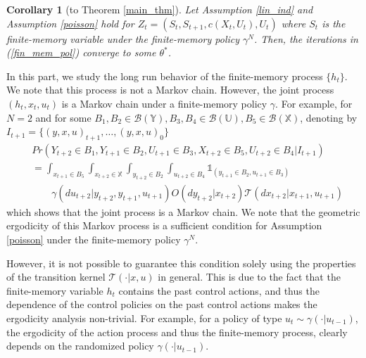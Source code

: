 \documentclass[11pt]{article}
\newtheorem{corollary}{Corollary}
\begin{document}
\begin{corollary}[to Theorem \ref{main_thm}]
 Let Assumption \ref{lin_ind} and  Assumption \ref{poisson} hold for $Z_t= (S_t,S_{t+1},c(X_t,U_t),U_t)$ where $S_t$ is the finite-memory variable under the finite-memory policy $\gamma^N$. Then, the iterations in (\ref{fin_mem_pol}) converge to some $\theta^*$. 
\end{corollary}



 In this part, we study the long run behavior of the finite-memory process $\{h_t\}$. We note that this process is not a Markov chain. However, the joint process $(h_t,x_{t},u_t)$ is a Markov chain under a finite-memory policy $\gamma$. For example, for $N=2$ and for some $B_1, B_2 \in  \mathcal{B}(\mathds{Y}), B_3,B_4 \in \mathcal{B}(\mathds{U}), B_5 \in \mathcal{B}(\mathds{X}) $, denoting by $I_{t+1} = \{(y,x,u)_ {t+1},\dots,(y,x,u)_{0}\}$
\begin{align*}
&Pr({Y}_{t+2} \in B_1,{Y}_{t+1} \in B_2, U_{t+1} \in B_3, X_{t+2}\in B_5,  {U}_{t+2}\in B_4 | I_{t+1} )\\
&= \int_{x_{t+1}\in B_5}\int_{x_{t+2}\in\mathds{X}} \int_{y_{t+2}\in B_2} \int_{u_{t+2}\in B_4}\mathds{1}_{(y_{t+1} \in B_2, u_{t+1}\in B_3)} \\
&  \qquad\gamma(du_{t+2}|y_{t+2},y_{t+1},u_{t+1})O(dy_{t+2}|x_{t+2}) \mathcal{T}(dx_{t+2}|x_{t+1},u_{t+1})
\end{align*}
which shows that the joint process is a Markov chain. We note that the geometric ergodicity of this Markov process is a sufficient condition for Assumption \ref{poisson} under the finite-memory policy $\gamma^N$.  


However, it is not possible to guarantee this condition solely using the properties of the transition kernel $\mathcal{T}(\cdot|x,u)$  in general. This is due to the fact that the finite-memory variable $h_t$ contains the past control actions, and thus the dependence of the control policies on the past control actions makes the ergodicity analysis non-trivial.  For example, for a policy of type $u_t\sim\gamma(\cdot|u_{t-1})$, the ergodicity of the action process and thus the finite-memory process, clearly depends on the randomized policy $\gamma(\cdot|u_{t-1})$.
\end{document}
